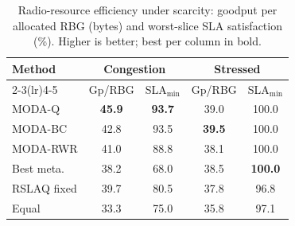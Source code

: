 \begin{table}[t]
\centering
\caption{Radio-resource efficiency under scarcity: goodput per allocated RBG (bytes) and worst-slice SLA satisfaction (\%). Higher is better; best per column in bold.}
\label{tab:moda_radio}
\begin{tabular}{lcccc}
\toprule
Method & \multicolumn{2}{c}{Congestion} & \multicolumn{2}{c}{Stressed} \\
\cmidrule(lr){2-3}\cmidrule(lr){4-5}
 & Gp/RBG & SLA$_{\min}$ & Gp/RBG & SLA$_{\min}$ \\
\midrule
MODA-Q & \textbf{45.9} & \textbf{93.7} & 39.0 & 100.0 \\
MODA-BC & 42.8 & 93.5 & \textbf{39.5} & 100.0 \\
MODA-RWR & 41.0 & 88.8 & 38.1 & 100.0 \\
\midrule
Best meta. & 38.2 & 68.0 & 38.5 & \textbf{100.0} \\
RSLAQ fixed & 39.7 & 80.5 & 37.8 & 96.8 \\
Equal & 33.3 & 75.0 & 35.8 & 97.1 \\
\bottomrule
\end{tabular}
\end{table}
